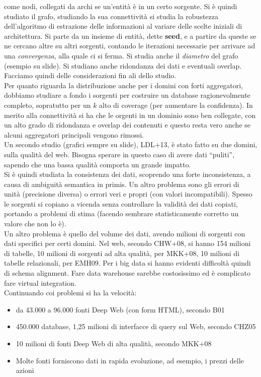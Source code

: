 \documentclass[a4paper,12pt, oneside]{book}
\begin{document}
come nodi, collegati da archi se un'entità è in un certo sorgente. Si è quindi
studiato il grafo, studiando la sua connettività si studia la robustezza
dell'algoritmo di estrazione delle informazioni al variare delle scelte iniziali
di architettura. Si parte da un insieme di entità, dette \textbf{seed}, e a
partire da queste se ne cercano altre su altri sorgenti, contando le iterazioni
necessarie per arrivare ad una \textit{convergenza}, alla quale ci si ferma. Si
studia anche il \textit{diametro} del grafo (esempio su slide). Si studiano
anche ridondanza dei dati e eventuali overlap.\\
Facciamo quindi delle considerazioni fin ali dello studio.\\
Per quanto riguarda la distribuzione anche per i domini con forti aggregatori,
dobbiamo studiare a fondo i sorgenti per costruire un database
ragionevolmente completo, sopratutto per un $k$ alto di coverage (per aumentare
la confidenza). In merito alla connettività si ha che le orgenti in un dominio
sono ben collegate, con un alto grado di ridondanza e overlap dei
contenuti e questo resta vero anche se alcuni aggregatori principali vengono
rimossi. \\
Un secondo studio (grafici sempre su slide), LDL+13, è stato fatto su due
domini, sulla qualità del web. Bisogna sperare in questo caso di avere dati
``puliti'', sapendo che una bassa qualità comporta un grande impatto.\\
Si è quindi studiata la consistenza dei dati, scoprendo una forte inconsistenza,
a causa di ambiguità semantica in primis. Un altro problema sono gli errori di
unità (precisione diversa) o errori veri e propri (con valori
incompatibili). Spesso le sorgenti si copiano a vicenda senza controllare la
validità dei dati copiati, portando a problemi di stima (facendo sembrare
statisticamente corretto un valore che non lo è).\\
Un altro problema è quello del volume dei dati, avendo milioni di sorgenti con
dati specifici per certi domini. Nel web, secondo CHW+08, si hanno 154 milioni
di tabelle, 10 milioni di sorgenti ad alta qualità, per MKK+08, 10 milioni di
tabelle relazionali, per EMH09. Per i big data si hanno evidenti difficoltà
quindi di schema alignment. Fare data warehouse sarebbe costosissimo ed è
complicato fare virtual integration.\\
Continuando coi problemi si ha la velocità:
\begin{itemize}
  \item da 43.000 a 96.000 fonti Deep Web (con form HTML), secondo B01
  \item 450.000 database, 1,25 milioni di interfacce di query sul Web, secondo
  CHZ05  
  \item 10 milioni di fonti Deep Web di alta qualità, secondo MKK+08 
  \item Molte fonti forniscono dati in rapida
  evoluzione, ad esempio, i prezzi delle azioni 
\end{itemize}
\end{document}
